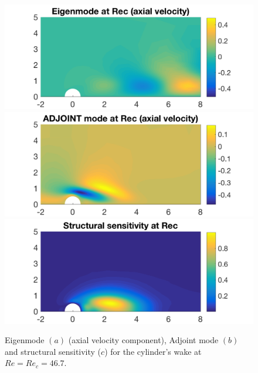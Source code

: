 \documentclass[twocolumn,10pt]{asme2ej}
\begin{document}



\begin{figure}
\includegraphics[width=.9 \linewidth]{Cylinder_EigenModeReC.png}
\includegraphics[width=.9 \linewidth]{Cylinder_EigenModeAdjReC.png}
\includegraphics[width=.9 \linewidth]{Cylinder_SensitivityReC.png}
\caption{Eigenmode $(a)$  (axial velocity component),  Adjoint mode $(b)$ and structural sensitivity ($c$) for the cylinder's wake at $Re=Re_c = 46.7$.}
\label{fig:Eigenmode}
\end{figure}
\end{document}
